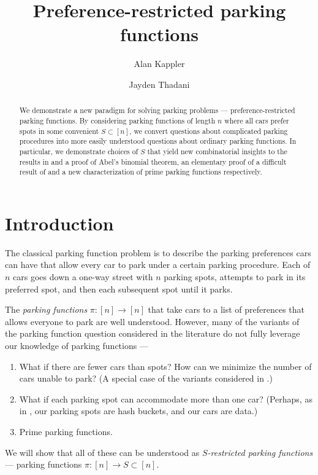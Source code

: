 \documentclass[12 pt]{amsart}
\title{Preference-restricted parking functions}
\author[Kappler]{Alan Kappler}
\author[Thadani]{Jayden Thadani}
\theoremstyle{definition} %
\theoremstyle{remark} %
\begin{document}
	

\begin{abstract}
	We demonstrate a new paradigm for solving parking problems --- preference-restricted parking functions. By considering parking functions of length $n$ where all cars prefer spots in some convenient $S \subset [n]$, we convert questions about complicated parking procedures into more easily understood questions about ordinary parking functions. In particular, we demonstrate choices of $S$ that yield new combinatorial insights to the results in \cite{cameron-johannsen-prellberg-schweitzer-2008} and a proof of Abel's binomial theorem, an elementary proof of a difficult result of \cite{blake-konheim-1977} and a new characterization of prime parking functions respectively.
\end{abstract}

\maketitle

\pagebreak

\tableofcontents

\pagebreak

\makeatletter
\providecommand\@dotsep{5}
\makeatother
\listoftodos\relax

\pagebreak

\section{Introduction}

The classical parking function problem is to describe the parking preferences cars can have that allow every car to park under a certain parking procedure. Each of $n$ cars goes down a one-way street with $n$ parking spots, attempts to park in its preferred spot, and then each subsequent spot until it parks.

The \emph{parking functions} $\pi : [n] \to [n]$ that take cars to a list of preferences that allows everyone to park are well understood. However, many of the variants of the parking function question considered in the literature do not fully leverage our knowledge of parking functions ---
\begin{enumerate}
	\item What if there are fewer cars than spots? How can we minimize the number of cars unable to park? (A special case of the variants considered in \cite{cameron-johannsen-prellberg-schweitzer-2008}.)
	\item What if each parking spot can accommodate more than one car? (Perhaps, as in \cite{blake-konheim-1977}, our parking spots are hash buckets, and our cars are data.)
	\item Prime parking functions.
\end{enumerate}
We will show that all of these can be understood as \emph{$S$-restricted parking functions} --- parking functions $\pi : [n] \to S \subset [n]$. 
\end{document}

